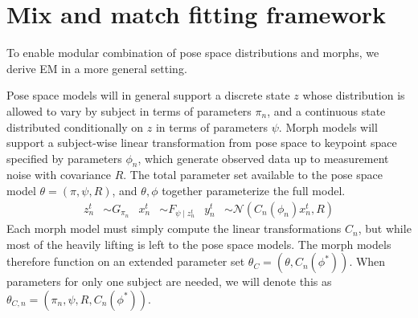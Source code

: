 \documentclass{article}         %
\newcommand{\NN}{\mathcal{N}}
\begin{document}
\section{Mix and match fitting framework}

To enable modular combination of pose space distributions and morphs, we derive EM in a more general setting.

Pose space models will in general support a discrete state $z$ whose distribution is allowed to vary by subject in terms of parameters $\pi_n$, and a continuous state distributed conditionally on $z$ in terms of parameters $\psi$. Morph models will support a subject-wise linear transformation from pose space to keypoint space specified by parameters $\phi_n$, which generate observed data up to measurement noise with covariance $R$. The total parameter set available to the pose space model $\theta = (\pi, \psi, R)$, and $\theta, \phi$ together parameterize the full model.
\begin{align}
    z^t_n &\sim G_{\pi_n} &
    x^t_n &\sim F_{\psi \mid z^t_n} &
    y^t_n &\sim \NN(C_n(\phi_n) x_n^t, R)
\end{align}
Each morph model must simply compute the linear transformations $C_n$, but while most of the heavily lifting is left to the pose space models. The morph models therefore function on an extended parameter set $\theta_C = (\theta, C_n(\phi^*))$. When parameters for only one subject are needed, we will denote this as $\theta_{C,n} = (\pi_n, \psi, R, C_n(\phi^*))$.
\end{document}

